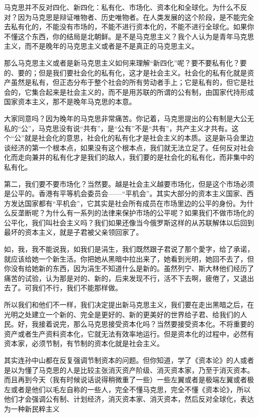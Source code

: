 \documentclass[UTF8, 12pt, a4paper]{ctexrep}
\begin{document}
马克思并不反对四化、新四化：私有化、市场化、资本化和全球化。为什么不反对？因为马克思是辩证唯物者、历史唯物者。在人类发展的这个阶段，是不能完全去私有化的，不能没有市场的，不能不进行资本化的，不能不进行全球化。如果你不懂这个东西，你的结局是北朝鲜。是不是马克思主义？我个人认为是青年马克思主义，而不是晚年的马克思主义或者是不是真正的马克思主义。

那么马克思主义或者是新马克思主义如何来理解“新四化”呢？要不要私有化？要的、要的；但是我们要社会化的私有化，这才是社会主义。社会化的私有化就是资产虽然是私有，但正态分布于整个社会的所有劳动者手上；它是私有的，但它是社会的，它集合起来是社会主义的，而不是用苏联的所谓的公有制，由国家代持形成国家资本主义，那不是晚年马克思的本意。

大家同意吗？因为晚年的马克思非常痛苦。你记着，马克思提出的公有制是大公无私的“公”，马克思没有说“共有”，是“公有”不是“共有”，共产主义才共有。这个“公”就是社会化的意思，社会化的私有化才是社会主义的本质。这是新马会里边谈经济的第一个根本点，如果没有这个根本点，我们就无法立足了。任何反对社会化而走向兼并的私有化才是我们的敌人，我们要的是社会化的私有化，而非集中的私有化。

第二，我们要不要市场化？当然要。越是社会主义越要市场化，但是这个市场必须是公平的。香港有平等机会委员会——“平机会”。其实大部分的资本主义国家、西方发达国家都有“平机会”，它其实是社会所有成员在市场里边的公平的身份。为什么反垄断呢？为什么有一系列的法律来保护市场的公平呢？如果我们不做市场化的公平化，我们叫社会主义吗？我们如果还像当今俄罗斯这样的从苏联解体以后回到最坏的资本主义，就是子君被父亲领回家了。

如，我，我不能说我，如我们是涓生，我们既然跟子君说了那个愛字，给了承诺，就应该给她一个新生活。你把她从黑暗中拉出来了，她看到光明，她回不去了，但你没有给她新的东西，因为涓生不知道什么是新的。虽然列宁、斯大林他们经历了痛苦的试验，认为那是对的、新的，后来发现不行，活不下去啊，疲倦了，又退出去了。可我们不行，我们不能那样做。

所以我们和他们不一样，我们决定提出新马克思主义，我们要在走出黑暗之后，在光明之处建立一个新的、完全是更好的、新的更美好的世界给子君、给我们的人民。好，我接着说完，那么马克思接受资本化吗？当然要接受资本化。不将重要的资产或者生产资料资本化，它就无法有效率地运行。但是资本化的过程中，必然有资本家，必须节制，有节制的资本化就是社会主义。

其实连孙中山都在反复强调节制资本的问题。但你知道，学了《资本论》的人或者是以为懂了马克思的人是比较主张消灭资产阶级、消灭资本家，乃至于消灭资本。而且再到今天（我有时候说话说得稍微重了一些）一些左翼或者是极端左翼或者极左或者是他们以毛左自称的一些人，完全不懂马克思，完全不懂《资本论》，所以他们才会强调公有制、计划经济，消灭资本家、消灭资本，然后反对全球化，表达为一种新民粹主义
\end{document}
